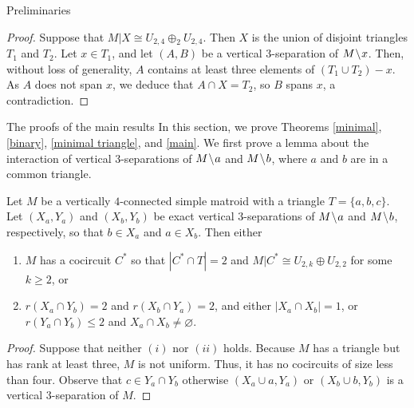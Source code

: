 \documentclass[12pt]{amsart}
\begin{document}
\begin{section}{Preliminaries}
\begin{proof}
Suppose that $M|X \cong U_{2,4} \oplus_2 U_{2,4}$.
Then $X$ is the union of disjoint triangles $T_1$ and $T_2$.
Let $x \in T_1$, and let $(A,B)$ be a vertical $3$-separation of $M \!\setminus\! x$.
Then, without loss of generality, $A$ contains at least three elements of $(T_1 \cup T_2) - x$.
As $A$ does not span $x$, we deduce that $A \cap X = T_2$, so $B$ spans $x$, a contradiction.
\end{proof}



\end{section}







\begin{section}{The proofs of the main results} \label{main proofs}
In this section, we prove Theorems \ref{minimal}, \ref{binary}, \ref{minimal triangle}, and \ref{main}.
We first prove a lemma about the interaction of vertical $3$-separations of $M \!\setminus\! a$ and $M \!\setminus\! b$, where $a$ and $b$ are in a common triangle.

\begin{lemma} \label{technical}
Let $M$ be a vertically $4$-connected simple matroid with a triangle $T = \{a, b, c\}$.
Let $(X_a, Y_a)$ and $(X_b, Y_b)$ be exact vertical $3$-separations of $M \!\setminus\! a$ and $M \!\setminus\! b$, respectively, so that $b \in X_a$ and $a \in X_b$. 
Then either
\begin{enumerate}[$(i)$]
\item $M$ has a cocircuit $C^*$ so that $|C^* \cap T| = 2$ and $M|C^* \cong U_{2,k} \oplus U_{2,2}$ for some $k \ge 2$, or

\item $r(X_a \cap Y_b) = 2$ and $r(X_b \cap Y_a) = 2$, and either $|X_a \cap X_b| = 1$, or $r(Y_a \cap Y_b) \le 2$ and $X_a \cap X_b \ne \varnothing$.
\end{enumerate}
\end{lemma}
\begin{proof}
Suppose that neither $(i)$ nor $(ii)$ holds.
Because $M$ has a triangle but has rank at least three, $M$ is not uniform.
Thus, it has no cocircuits of size less than four.
Observe that $c \in Y_a \cap Y_b$ otherwise $(X_a \cup a, Y_a)$ or $(X_b \cup b, Y_b)$ is a vertical $3$-separation of $M$.



\end{proof}
\end{section}
\end{document}
